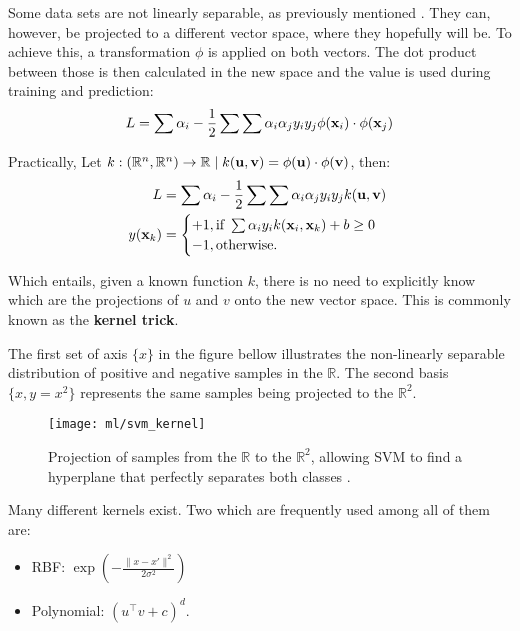 Some data sets are not linearly separable, as previously mentioned	. They can, however, be projected to a different vector space, where they hopefully will be. To achieve this, a transformation $\phi$ is applied on both vectors. The dot product between those is then calculated in the new space and the value is used during training and prediction:
\begin{gather*}
L = \sum\alpha_i -\frac{1}{2}\sum\sum\alpha_i\alpha_j y_i y_j \phi(\mathbf{x}_i) \cdot \phi(\mathbf{x}_j)
\end{gather*}

\begin{remark}
	Practically, Let $k: (\mathbb{R}^n, \mathbb{R}^n) \rightarrow \mathbb{R} \mid k(\mathbf{u}, \mathbf{v}) = \phi(\mathbf{u}) \cdot \phi(\mathbf{v})$, then:
	\begin{align*}
	L &= \sum\alpha_i -\frac{1}{2}\sum\sum\alpha_i\alpha_j y_i y_j k(\mathbf{u}, \mathbf{v}) \\
	y(\mathbf{x}_k) &= \begin{cases}
			+1, \text{if } \sum\alpha_i y_i k(\mathbf{x}_i, \mathbf{x}_k) +b \geq 0\\
			-1, \text{otherwise.}
		\end{cases}
	\end{align*}
	
	Which entails, given a known function $k$, there is no need to explicitly know which are the projections of $u$ and $v$ onto the new vector space. This is commonly known as the \textbf{kernel trick}.
\end{remark}

The first set of axis $\{x\}$ in the figure bellow illustrates the non-linearly separable distribution of positive and negative samples in the $\mathbb{R}$. The second basis $\{x, y=x^2\}$ represents the same samples being projected to the $\mathbb{R}^2$.

\begin{figure}[H]
	\centering
	\captionsetup{justification=centering}

	\texttt{[image: ml/svm\_kernel]}
	\caption{Projection of samples from the $\mathbb{R}$ to the $\mathbb{R}^2$, allowing SVM to find a hyperplane that perfectly separates both classes \cite{svmkernels}.}
	\label{fig:svmkernel}
\end{figure}

Many different kernels exist. Two which are frequently used among all of them\cite{svmkernels} are:
\begin{itemize}
	\item RBF: $\exp(-\frac{\|x -x'\|^2}{2\sigma^2})$
	\item Polynomial: $(u^\top v + c)^{d}$.
\end{itemize}

